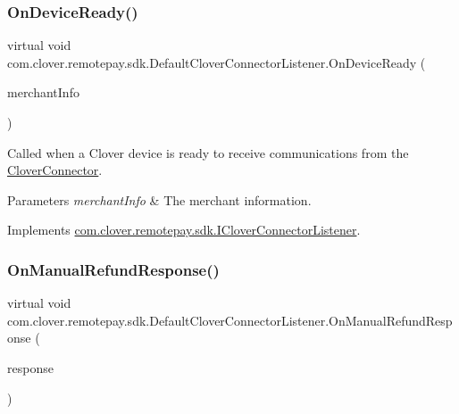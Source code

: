 \subsubsection{\texorpdfstring{On\+Device\+Ready()}{OnDeviceReady()}}
{\footnotesize\ttfamily virtual void com.\+clover.\+remotepay.\+sdk.\+Default\+Clover\+Connector\+Listener.\+On\+Device\+Ready (\begin{DoxyParamCaption}\item[{\hyperlink{classcom_1_1clover_1_1remotepay_1_1sdk_1_1_merchant_info}{Merchant\+Info}}]{merchant\+Info }\end{DoxyParamCaption})\hspace{0.3cm}{\ttfamily [virtual]}}



Called when a Clover device is ready to receive communications from the \hyperlink{classcom_1_1clover_1_1remotepay_1_1sdk_1_1_clover_connector}{Clover\+Connector}. 


\begin{DoxyParams}{Parameters}
{\em merchant\+Info} & The merchant information.\\
\hline
\end{DoxyParams}


Implements \hyperlink{interfacecom_1_1clover_1_1remotepay_1_1sdk_1_1_i_clover_connector_listener_a6c7bff0d9fe64dc624fb175ef33e5299}{com.\+clover.\+remotepay.\+sdk.\+I\+Clover\+Connector\+Listener}.

\mbox{\label{classcom_1_1clover_1_1remotepay_1_1sdk_1_1_default_clover_connector_listener_a8294033c92e3c74aea2aac5e47c72873}} 
\subsubsection{\texorpdfstring{On\+Manual\+Refund\+Response()}{OnManualRefundResponse()}}
{\footnotesize\ttfamily virtual void com.\+clover.\+remotepay.\+sdk.\+Default\+Clover\+Connector\+Listener.\+On\+Manual\+Refund\+Response (\begin{DoxyParamCaption}\item[{\hyperlink{classcom_1_1clover_1_1remotepay_1_1sdk_1_1_manual_refund_response}{Manual\+Refund\+Response}}]{response }\end{DoxyParamCaption})\hspace{0.3cm}{\ttfamily [virtual]}}



